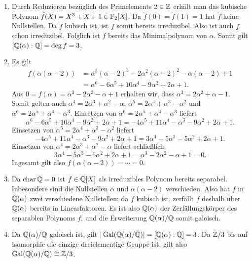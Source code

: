 \begin{solution}
  \begin{enumerate}
    \item
      Durch Reduzieren bezüglich des Primelements $2 \in \mathbb{Z}$ erhält man das kubische Polynom $\tilde{f}(X) = X^3 + X + 1 \in \mathbb{F}_2[X]$.
      Da $\tilde{f}(0) = \tilde{f}(1) = 1$ hat $\tilde{f}$ keine Nullstellen.
      Da $\tilde{f}$ kubisch ist, ist $\tilde{f}$ somit bereits irreduzibel.
      Also ist auch $f$ schon irreduzibel.
      Folglich ist $f$ bereits das Minimalpolynom von $\alpha$.
      Somit gilt $[\mathbb{Q}(\alpha) : \mathbb{Q}] = \deg f = 3$.
      
    \item
      Es gilt
      \begin{align*}
        \label{equation: polynomial of degree 6}
            f(\alpha(\alpha-2))
        &=  \alpha^3 (\alpha-2)^3 - 2 \alpha^2 (\alpha-2)^2 - \alpha(\alpha-2) + 1
        \\
        &=  \alpha^6 - 6 \alpha^5 + 10 \alpha^4 - 9 \alpha^2 + 2 \alpha + 1.
      \end{align*}
      Aus $0 = f(\alpha) = \alpha^3 - 2 \alpha^2 - \alpha + 1$ erhalten wir, dass $\alpha^3 = 2 \alpha^2 + \alpha - 1$.
      Somit gelten auch $\alpha^4 = 2 \alpha^3 + \alpha^2 - \alpha$, $\alpha^5 = 2 \alpha^4 + \alpha^3 - \alpha^2$ und $\alpha^6 = 2 \alpha^5 + \alpha^4 - \alpha^3$.
      Einsetzen von $\alpha^6 = 2 \alpha^5 + \alpha^4 - \alpha^3$ liefert
      \[
          \alpha^6 - 6 \alpha^5 + 10 \alpha^4 - 9 \alpha^2 + 2 \alpha + 1
        = -4 \alpha^5 + 11 \alpha^4 - \alpha^3 - 9 \alpha^2 + 2 \alpha + 1.
      \]
      Einsetzen von $\alpha^5 = 2 \alpha^4 + \alpha^3 - \alpha^2$ liefert
      \[
          -4 \alpha^5 + 11 \alpha^4 - \alpha^3 - 9 \alpha^2 + 2 \alpha + 1
        = 3 \alpha^4 - 5 \alpha^3 - 5 \alpha^2 + 2 \alpha + 1.
      \]
      Einsetzen von $\alpha^4 = 2 \alpha^3 + \alpha^2 - \alpha$ liefert schließlich
      \[
          3 \alpha^4 - 5 \alpha^3 - 5 \alpha^2 + 2 \alpha + 1
        = \alpha^3 - 2 \alpha^2 - \alpha + 1
        = 0.
      \]
      Ingesamt gilt also $f(\alpha (\alpha - 2)) = \dotsb = 0$.
%       
    \item
      Da $\operatorname{char} \mathbb{Q} = 0$ ist $f \in \mathbb{Q}[X]$ als irreduzibles Polynom bereits separabel.
      Inbesondere sind die Nullstellen $\alpha$ und $\alpha (\alpha - 2)$ verschieden.
      Also hat $f$ in $\mathbb{Q}(\alpha)$ zwei verschiedene Nullstellen; da $f$ kubisch ist, zerfällt $f$ deshalb über $\mathbb{Q}(\alpha)$ bereits in Linearfaktoren.
      Es ist also $\mathbb{Q}(\alpha)$ der Zerfällungskörper des separablen Polynoms $f$, und die Erweiterung $\mathbb{Q}(\alpha)/\mathbb{Q}$ somit galoisch.
%       
    \item
      Da $\mathbb{Q}(\alpha)/\mathbb{Q}$ galoisch ist, gilt $|\operatorname{Gal}(\mathbb{Q}(\alpha)/\mathbb{Q})| = [\mathbb{Q}(\alpha) : \mathbb{Q}] = 3$.
      Da $\mathbb{Z}/3$ bis auf Isomorphie die einzige dreielementige Gruppe ist, gilt also $\operatorname{Gal}(\mathbb{Q}(\alpha)/\mathbb{Q}) \cong \mathbb{Z}/3$.
  \end{enumerate}
\end{solution}


